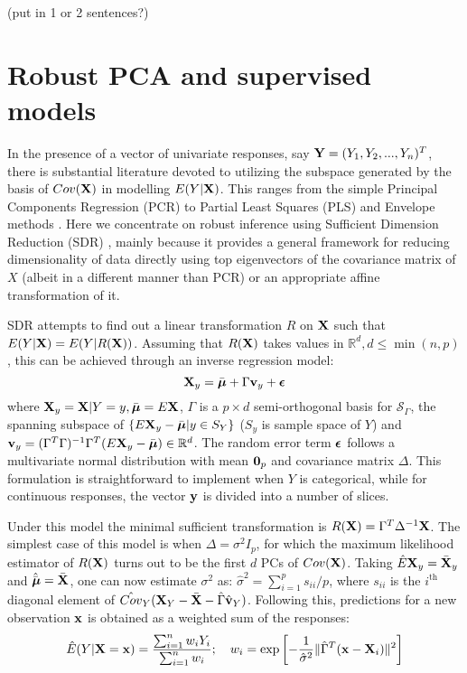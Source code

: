 \documentclass[fleqn,11pt]{article}
\begin{document}
{\colrbf (put in 1 or 2 sentences?)}

\section{Robust PCA and supervised models}

In the presence of a vector of univariate responses, say ${\mathbf{Y}} = (Y_1,Y_2,...,Y_n)^T$, there is substantial literature devoted to utilizing the subspace generated by the basis of $Cov({\mathbf{X}})$ in modelling $E(Y|{\mathbf{X}})$. This ranges from the simple Principal Components Regression (PCR) to Partial Least Squares (PLS) and Envelope methods \citep{Cook10}. Here we concentrate on robust inference using Sufficient Dimension Reduction (SDR) \citep{AdragniCook09}, mainly because it provides a general framework for reducing dimensionality of data directly using top eigenvectors of the covariance matrix of $X$ (albeit in a different manner than PCR) or an appropriate affine transformation of it.

SDR attempts to find out a linear transformation $R$ on ${\mathbf{X}}$ such that $E(Y|{\mathbf{X}}) = E(Y|R({\mathbf{X}}))$. Assuming that $R({\mathbf{X}})$ takes values in $\mathbb R^d, d \leq \min(n,p)$, this can be achieved through an inverse regression model:
%
\begin{equation}
{\mathbf{X}}_y = \bar {{\boldsymbol{\mu}}} + \Gamma {\bf{v}}_y + {\boldsymbol{\epsilon}}
\end{equation}
%
where ${\mathbf{X}}_y = {\mathbf{X}}|Y=y, \bar{{\boldsymbol{\mu}}} = E{\mathbf{X}}$, $\Gamma$ is a $p \times d$ semi-orthogonal basis for $\mathcal S_\Gamma$, the spanning subspace of $\{ E {\mathbf{X}}_y - \bar{{\boldsymbol{\mu}}} | y \in S _Y \}$ ($S_y$ is sample space of $Y$) and ${\bf{v}}_y = (\Gamma^T \Gamma)^{-1} \Gamma^T (E {\mathbf{X}}_y - \bar{{\boldsymbol{\mu}}}) \in \mathbb R^d$. The random error term ${\boldsymbol{\epsilon}}$ follows a multivariate normal distribution with mean ${\bf 0}_p$ and covariance matrix $\Delta$. This formulation is straightforward to implement when $Y$ is categorical, while for continuous responses, the vector ${\bf{y}}$ is divided into a number of slices.

Under this model the minimal sufficient transformation is $R({\mathbf{X}}) = \Gamma^T \Delta^{-1} {\mathbf{X}}$. The simplest case of this model is when $\Delta = \sigma^2 I_p$, for which the maximum likelihood estimator of $ R({\mathbf{X}})$ turns out to be the first $d$ PCs of $Cov({\mathbf{X}})$. Taking $\hat E{\mathbf{X}}_y = \bar{{\mathbf{X}}}_y$ and $\hat{\bar{{\boldsymbol{\mu}}}} = \bar{{\mathbf{X}}}$, one can now estimate $\sigma^2$ as: $\hat\sigma^2 = \sum_{i=1}^p s_{ii}/p$, where $s_{ii}$ is the $i^\text{th}$ diagonal element of $\hat{Cov}_Y( {\mathbf{X}}_Y - \bar{{\mathbf{X}}} - \hat\Gamma \hat{{\bf{v}}}_Y)$. Following this, predictions for a new observation ${\bf{x}}$ is obtained as a weighted sum of the responses:
%
$$
\hat E(Y|{\mathbf{X}}={\bf{x}}) = \frac{\sum_{i=1}^n w_i Y_i}{\sum_{i=1}^n w_i}; \quad w_i = \exp \left[ -\frac{1}{\hat\sigma^2}  \| \hat\Gamma^T ({\bf{x}} - {\mathbf{X}}_i) \|^2 \right]
$$
%
\end{document}
